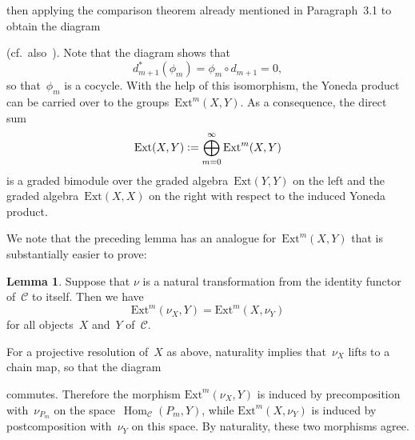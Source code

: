 \documentclass[12pt]{article}
\makeatletter
\theoremstyle{definition}
\newtheorem{Lemma}[Satz]{Lemma}
\theoremstyle{break}
\renewenvironment{proof}[1][\proofname]{\par
\vspace{-5pt}%
\pushQED{\qed}%
\normalfont
\topsep0pt \partopsep0pt %
\trivlist
\item[\hskip\labelsep
\bfseries
#1\@addpunct{.}]\ignorespaces
}{%
\popQED\endtrivlist\@endpefalse
\addvspace{6pt plus 6pt} %
}
\newcommand{\CC}{\mathcal{C}}
\DeclareMathOperator\Hom{Hom}
\DeclareMathOperator\id{id}
\newcommand{\Ext}{\mathrm{Ext}}
\renewcommand{\1}{\mathbbm{1}}
\newcommand{\deq}{\vcentcolon =}
\makeatother
\begin{document}
then applying the comparison theorem already mentioned in Paragraph~3.1 to obtain the diagram
\begin{center}
\end{center}
(cf.~also~\cite[Sec.~2.6, p.~39]{Be}).
Note that the diagram shows that
\[d_{m+1}^*(\phi_m) = \phi_m \circ d_{m+1} = 0,\]
so that~$\phi_m$ is a cocycle. With the help of this isomorphism, the Yoneda product can be carried over to the groups~$\Ext^m(X,Y)$. As a consequence, the direct sum
\[\Ext(X,Y) \deq \bigoplus_{m=0}^\infty \Ext^m(X,Y)\]
is a graded bimodule over the graded algebra~$\Ext(Y,Y)$ on the left and the graded algebra~$\Ext(X,X)$ on the right with respect to the induced Yoneda product.

We note that the preceding lemma has an analogue for~$\Ext^m(X,Y)$ that is substantially easier to prove:
\begin{Lemma} \label{ExtNat}
Suppose that $\nu$ is a natural transformation from the
identity functor of~$\CC$ to itself. Then we have
\[\Ext^m(\nu_X,Y) = \Ext^m(X,\nu_Y)\]
for all objects~$X$ and~$Y$ of~$\CC$.
\end{Lemma}
\begin{proof}
For a projective resolution of~$X$ as above, naturality implies that~$\nu_X$ lifts to a chain map, so that the diagram
\begin{center}
\end{center}
commutes. Therefore the morphism $\Ext^m(\nu_X,Y)$ is induced by precomposition with~$\nu_{P_m}$ on the space~$\Hom_\CC(P_m,Y)$, while $\Ext^m(X,\nu_Y)$ is induced by postcomposition with~$\nu_{Y}$ on this space. By naturality, these two morphisms agree.
\end{proof}
\end{document}
